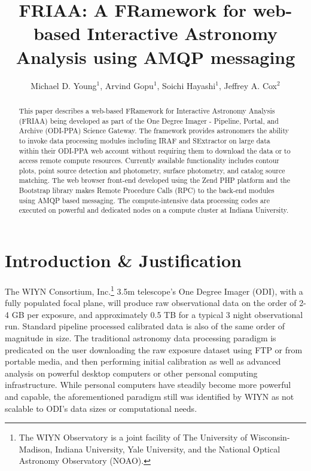 \documentclass[11pt,twoside]{article}
\begin{document}
\title{%
FRIAA: A FRamework for web-based Interactive Astronomy Analysis using AMQP messaging}
\author{Michael D. Young$^1$, Arvind Gopu$^1$, Soichi Hayashi$^1$, Jeffrey A. Cox$^2$}

\begin{abstract}

This paper describes a web-based FRamework for Interactive Astronomy Analysis (FRIAA) being developed as part of the One Degree Imager - Pipeline, Portal, and Archive (ODI-PPA) Science Gateway. The framework provides astronomers the ability to invoke data processing modules including IRAF and SExtractor on large data within their ODI-PPA web account without requiring them to download the data or to access remote compute resources. Currently available functionality includes contour plots, point source detection and photometry, surface photometry, and catalog source matching. The web browser front-end developed using the Zend PHP platform and the Bootstrap library makes Remote Procedure Calls (RPC) to the back-end modules using AMQP based messaging. The compute-intensive data processing codes are executed on powerful and dedicated nodes on a compute cluster at Indiana University. 

\end{abstract}

\section{Introduction \& Justification}
\label{section:intro}

The WIYN Consortium, Inc.\footnote{The WIYN Observatory is a joint facility of The University of Wisconsin-Madison, Indiana University, Yale University, and the National Optical Astronomy Observatory (NOAO).} 3.5m telescope's One Degree Imager (ODI), with a fully populated focal plane, will produce raw observational data on the order of 2-4 GB per exposure, and approximately 0.5 TB for a typical 3 night observational run. Standard pipeline processed calibrated data is also of the same order of magnitude in size. The traditional astronomy data processing paradigm is predicated on the user downloading the raw exposure dataset using FTP or from portable media, and then performing initial calibration as well as advanced analysis on powerful desktop computers or other personal computing infrastructure. While personal computers have steadily become more powerful and capable, the aforementioned paradigm still was identified by WIYN as not scalable to ODI's data sizes or computational needs. 
\end{document}
